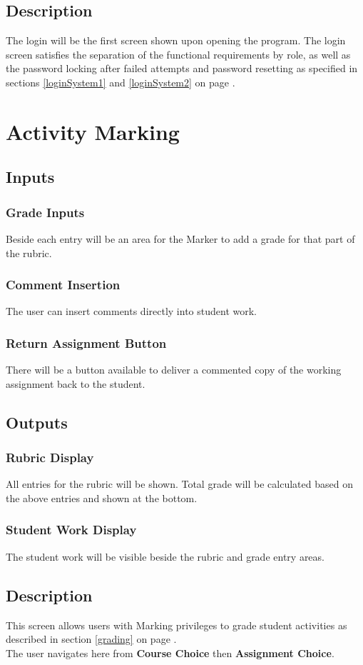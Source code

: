 \documentclass{article}
\begin{document}
\subsection{Description}
The login will be the first screen shown upon opening the program. The login screen 
satisfies the separation of the functional requirements by role, as well as the password locking
after failed attempts and password resetting as specified in sections \ref{loginSystem1} and
\ref{loginSystem2} on page \pageref{loginSystem1}.

\section{Activity Marking}
\subsection{Inputs}
\subsubsection{Grade Inputs}
Beside each entry will be an
area for the Marker to add a grade for that part of the rubric.
\subsubsection{Comment Insertion}
The user can insert comments directly into student work.
\subsubsection{Return Assignment Button}
There will be a button available to deliver a commented copy of the working
assignment back to the student.
\subsection{Outputs}
\subsubsection{Rubric Display}
All entries for the rubric will be shown.
Total grade will be calculated based on the above entries and shown at the
bottom.
\subsubsection{Student Work Display}
The student work will be visible beside the rubric and grade entry areas.
\subsection{Description}
This screen allows users with Marking privileges to grade student activities
as described in section \ref{grading} on page \pageref{grading}.\\
The user navigates here from \textbf{Course Choice} then \textbf{Assignment Choice}.
\end{document}
